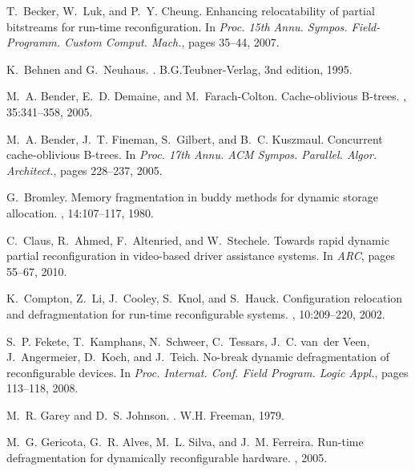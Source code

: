 \documentclass{article}
\begin{document}
\newcommand{\noopsort}[1]{}
\begin{thebibliography}{10}

T.~Becker, W.~Luk, and P.~Y. Cheung.
\newblock Enhancing relocatability of partial bitstreams for run-time
  reconfiguration.
\newblock In {\em Proc. 15th Annu. Sympos. Field-Programm. Custom Comput.
  Mach.}, pages 35--44, 2007.

K.~Behnen and G.~Neuhaus.
.
\newblock B.G.Teubner-Verlag, 3nd edition, 1995.

M.~A. Bender, E.~D. Demaine, and M.~Farach-Colton.
\newblock Cache-oblivious {B}-trees.
, 35:341--358, 2005.

M.~A. Bender, J.~T. Fineman, S.~Gilbert, and B.~C. Kuszmaul.
\newblock Concurrent cache-oblivious {B}-trees.
\newblock In {\em Proc. 17th Annu. ACM Sympos. Parallel. Algor. Architect.},
  pages 228--237, 2005.

G.~Bromley.
\newblock Memory fragmentation in buddy methods for dynamic storage allocation.
, 14:107--117, 1980.

C.~Claus, R.~Ahmed, F.~Altenried, and W.~Stechele.
\newblock Towards rapid dynamic partial reconfiguration in video-based driver
  assistance systems.
\newblock In {\em ARC}, pages 55--67, 2010.

K.~Compton, Z.~Li, J.~Cooley, S.~Knol, and S.~Hauck.
\newblock Configuration relocation and defragmentation for run-time
  reconfigurable systems.
, 10:209--220, 2002.

S.~P. Fekete, T.~Kamphans, N.~Schweer, C.~Tessars, J.~C. van~der Veen,
  J.~Angermeier, D.~Koch, and J.~Teich.
\newblock No-break dynamic defragmentation of reconfigurable devices.
\newblock In {\em Proc. Internat. Conf. Field Program. Logic Appl.}, pages
  113--118, 2008.

M.~R. Garey and D.~S. Johnson.
.
\newblock W.H. Freeman, 1979.

M.~G. Gericota, G.~R. Alves, M.~L. Silva, and J.~M. Ferreira.
\newblock Run-time defragmentation for dynamically reconfigurable hardware.
, 2005.


\end{thebibliography}
\end{document}

